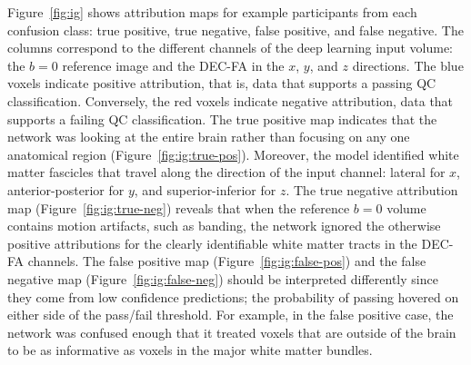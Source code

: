 \documentclass[9pt,lineno]{elife}
\begin{document}
Figure~\ref{fig:ig} shows attribution maps for example participants from each
confusion class: true positive, true negative, false positive, and false
negative. The columns correspond to the different channels of the deep learning
input volume: the $b=0$ reference image and the DEC-FA in the $x$, $y$, and $z$
directions. The blue voxels indicate positive attribution, that is, data that supports a passing QC classification. Conversely, the red voxels indicate negative attribution, data that supports a failing QC classification.
The true positive map indicates that the network was looking at the
entire brain rather than focusing on any one anatomical region
(Figure~\ref{fig:ig:true-pos}). Moreover, the model identified white matter
fascicles that travel along the direction of the input channel: lateral for $x$,
anterior-posterior for $y$, and superior-inferior for $z$. The true negative
attribution map (Figure~\ref{fig:ig:true-neg}) reveals that when the reference
$b=0$ volume contains motion artifacts, such as banding, the network ignored the
otherwise positive attributions for the clearly identifiable white matter tracts
in the DEC-FA channels. The false positive map (Figure~\ref{fig:ig:false-pos})
and the false negative map (Figure~\ref{fig:ig:false-neg}) should be interpreted
differently since they come from low confidence predictions; the probability of
passing hovered on either side of the pass/fail threshold. For example, in the
false positive case, the network was confused enough that it treated voxels that
are outside of the brain to be as informative as voxels in the major white matter bundles.
\end{document}
